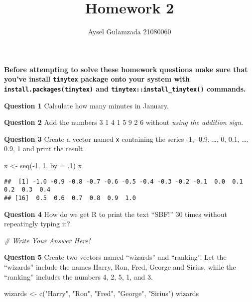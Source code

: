 \documentclass[
]{article}
\title{Homework 2}
\author{Aysel Gulamzada 21080060}
\date{}
\newenvironment{Shaded}{\begin{snugshade}}{\end{snugshade}}
\newcommand{\AttributeTok}[1]{\textcolor[rgb]{0.77,0.63,0.00}{#1}}
\newcommand{\CommentTok}[1]{\textcolor[rgb]{0.56,0.35,0.01}{\textit{#1}}}
\newcommand{\DecValTok}[1]{\textcolor[rgb]{0.00,0.00,0.81}{#1}}
\newcommand{\FunctionTok}[1]{\textcolor[rgb]{0.00,0.00,0.00}{#1}}
\newcommand{\NormalTok}[1]{#1}
\newcommand{\OtherTok}[1]{\textcolor[rgb]{0.56,0.35,0.01}{#1}}
\newcommand{\SpecialCharTok}[1]{\textcolor[rgb]{0.00,0.00,0.00}{#1}}
\newcommand{\StringTok}[1]{\textcolor[rgb]{0.31,0.60,0.02}{#1}}
\begin{document}
\maketitle

\textbf{Before attempting to solve these homework questions make sure
that you've install \texttt{tinytex} package onto your system with
\texttt{install.packages(tinytex)} and
\texttt{tinytex::install\_tinytex()} commands.}

\vspace{1cm}

\textbf{Question 1} Calculate how many minutes in January.

\textbf{Question 2} Add the numbers 3 1 4 1 5 9 2 6 without \emph{using
the addition sign}.

\textbf{Question 3} Create a vector named \texttt{x} containing the
series -1, -0.9, \ldots, 0, 0.1, \ldots, 0.9, 1 and print the result.

\begin{Shaded}
\begin{Highlighting}[]
\NormalTok{x }\OtherTok{\textless{}{-}} \FunctionTok{seq}\NormalTok{(}\SpecialCharTok{{-}}\DecValTok{1}\NormalTok{, }\DecValTok{1}\NormalTok{, }\AttributeTok{by =}\NormalTok{ .}\DecValTok{1}\NormalTok{)}
\NormalTok{x}
\end{Highlighting}
\end{Shaded}

\begin{verbatim}
##  [1] -1.0 -0.9 -0.8 -0.7 -0.6 -0.5 -0.4 -0.3 -0.2 -0.1  0.0  0.1  0.2  0.3  0.4
## [16]  0.5  0.6  0.7  0.8  0.9  1.0
\end{verbatim}

\textbf{Question 4} How do we get R to print the text ``SBF!'' 30 times
without repeatingly typing it?

\begin{Shaded}
\begin{Highlighting}[]
\CommentTok{\# Write Your Answer Here!}
\end{Highlighting}
\end{Shaded}

\textbf{Question 5} Create two vectors named ``wizards'' and
``ranking''. Let the ``wizards'' include the names Harry, Ron, Fred,
George and Sirius, while the ``ranking'' includes the numbers 4, 2, 5,
1, and 3.

\begin{Shaded}
\begin{Highlighting}[]
\NormalTok{wizards }\OtherTok{\textless{}{-}} \FunctionTok{c}\NormalTok{(}\StringTok{"Harry"}\NormalTok{, }\StringTok{"Ron"}\NormalTok{, }\StringTok{"Fred"}\NormalTok{, }\StringTok{"George"}\NormalTok{, }\StringTok{"Sirius"}\NormalTok{)}
\NormalTok{wizards}
\end{Highlighting}
\end{Shaded}
\end{document}
